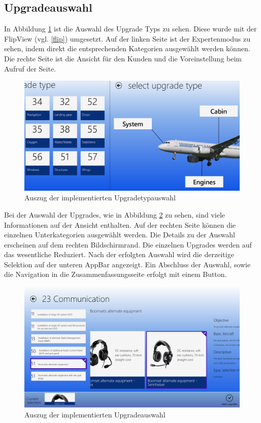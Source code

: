 \subsection{Upgradeauswahl}
In Abbildung \ref{upgradeTypeSelectionImpl} ist die Auswahl des Upgrade Typs zu sehen. Diese wurde mit der FlipView (vgl. \ref{flip}) umgesetzt. Auf der linken Seite ist der Expertenmodus zu sehen, indem direkt die entsprechenden Kategorien ausgewählt werden können. Die rechte Seite ist die Ansicht für den Kunden und die Voreinstellung beim Aufruf der Seite.
\begin{figure}[H]
\centering
\includegraphics[width=\hsize]{images/impl/select_upgrade_type_impl}
\caption{Auszug der implementierten Upgradetypauswahl}
\label{upgradeTypeSelectionImpl}
\end{figure}

Bei der Auswahl der Upgrades, wie in Abbildung \ref{upgradeSelectionImpl} zu sehen, sind viele Informationen auf der Ansicht enthalten. Auf der rechten Seite können die einzelnen Unterkategorien ausgewählt werden. Die Details zu der Auswahl erscheinen auf dem rechten Bildschirmrand. Die einzelnen Upgrades werden auf das wesentliche Reduziert. Nach der erfolgten Auswahl wird die derzeitige Selektion auf der unteren AppBar angezeigt. Ein Abschluss der Auswahl, sowie die Navigation in die Zusammenfassungsseite erfolgt mit einem Button. \par 
\begin{figure}[H]
\centering
\includegraphics[width=\hsize]{images/impl/select_upgrade_impl}
\caption{Auszug der implementierten Upgradeauswahl}
\label{upgradeSelectionImpl}
\end{figure}

